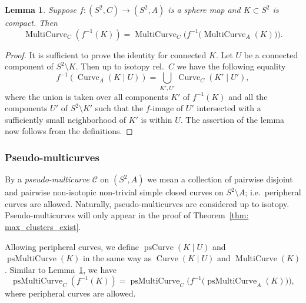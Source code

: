\documentclass{amsart}
\theoremstyle{plain}
\newtheorem{lemma}[theorem]{Lemma}
\theoremstyle{definition}
\theoremstyle{remark}
\newcommand{\CC}{{\mathcal C}}
\newcommand{\MC}{{\operatorname{MultiCurve}}}
\newcommand{\Curve}{{\operatorname{Curve}}}
\newcommand{\psMC}{{\operatorname{psMultiCurve}}}
\newcommand{\psCurve}{{\operatorname{psCurve}}}
\begin{document}
\begin{lemma}
\label{lem:MC:lifting}
Suppose $f\colon(S^2,C)\to (S^2,A)$ is a sphere map and $K\subset S^2$ is compact. Then
\[\MC_C( f^{-1}(K)) = \MC_C\big(f^{-1}\big(\MC_A(K) \big)\big).\] 
\end{lemma}
\begin{proof}
It is sufficient to prove the identity for connected $K$. Let $U$ be a connected component of $S^2\setminus K$.  Then up to isotopy rel.\ $C$ we have the following equality
\[f^{-1}(\Curve_A(K\mid U)) =\bigcup_{K',U'} \Curve_C(K'\mid U'),\]
where the union is taken over all components $K'$ of $f^{-1}(K)$ and all the components $U'$ of $S^2\setminus K'$ such that 
the $f$-image of $U'$ intersected with a sufficiently small neighborhood of $K'$ is within $U$. 
The assertion of the lemma now follows from the definitions. 
\end{proof}

\subsubsection{Pseudo-multicurves}\label{sss:psMC} By a \emph{pseudo-multicurve} $\CC$ on $(S^2,A)$ we mean a collection of pairwise disjoint and pairwise non-isotopic non-trivial simple closed curves on $S^2\setminus A$; i.e.~peripheral curves are allowed. Naturally, pseudo-multicurves are considered up  to isotopy. Pseudo-multicurves will only appear in the proof of Theorem~\ref{thm: max_clusters_exist}.

 Allowing peripheral curves, we define $\psCurve(K\mid U)$ and $\psMC(K)$ in the same way as $\Curve(K\mid U)$ and $\MC(K)$. Similar to Lemma~\ref{lem:MC:lifting}, we have 
\begin{equation}
\label{eq:sss:psMC}
\psMC_C( f^{-1}(K)) = \psMC_C\big(f^{-1}\big(\psMC_A(K) \big)\big),
\end{equation}
where peripheral curves are allowed.
\end{document}

